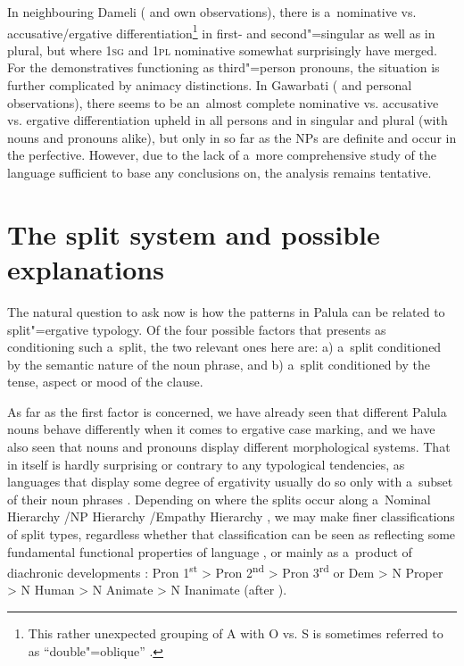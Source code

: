 In neighbouring Dameli (\citealt{morgenstierne1942} and own observations), there is a~nominative vs. accusative/ergative differentiation\footnote{This rather unexpected grouping of A with O vs. S is sometimes referred to as ``double"=oblique'' \citep{payne1980}.} in first- and second"=singular as well as in plural, but where \textsc{1sg} and \textsc{1pl} nominative somewhat surprisingly have merged. For the demonstratives functioning as third"=person pronouns, the situation is further complicated by animacy distinctions. In Gawarbati (\citealt{morgenstierne1950} and personal observations), there seems to be an~almost complete nominative vs. accusative vs. ergative differentiation upheld in all persons and in singular and plural (with nouns and pronouns alike), but only in so far as the NPs are definite and occur in the perfective. However, due to the lack of a~more comprehensive study of the language sufficient to base any conclusions on, the analysis remains tentative. 


\section{The split system and possible explanations}
\label{sec:11-5}


The natural question to ask now is how the patterns in Palula can be related to split"=ergative typology. Of the four possible factors that \citet[70]{dixon1994} presents as conditioning such a~split, the two relevant ones here are: a) a~split conditioned by the semantic nature of the noun phrase, and b) a~split conditioned by the tense, aspect or mood of the clause. 



As far as the first factor is concerned, we have already seen that different Palula nouns behave differently when it comes to ergative case marking, and we have also seen that nouns and pronouns display different morphological systems. That in itself is hardly surprising or contrary to any typological tendencies, as languages that display some degree of ergativity usually do so only with a~subset of their noun phrases \citep[261]{garrett1990}. Depending on where the splits occur along a~Nominal Hierarchy \citep[84--85]{dixon1994}/NP Hierarchy \citep[262]{garrett1990}/Empathy Hierarchy \citep[626--627]{delancey1981}, we may make finer classifications of split types, regardless whether that classification can be seen as reflecting some fundamental functional properties of language \citep{delancey1981}, or mainly as a~product of diachronic developments \citep{garrett1990}: Pron 1\textsuperscript{st} {\textgreater} Pron 2\textsuperscript{nd} {\textgreater} Pron 3\textsuperscript{rd} or Dem {\textgreater} N Proper {\textgreater} N Human {\textgreater} N Animate {\textgreater} N Inanimate (after \citealt[85]{dixon1994}).



